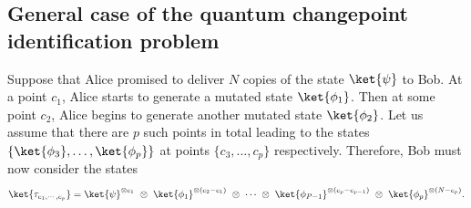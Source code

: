 \appendix

	
\begin{appendices}

\chapter{General case of the quantum changepoint identification problem} \label{app:mQCP}

Suppose that Alice promised to deliver $N$ copies of the state $\ket{\psi}$ to Bob.
At a point $c_1$, Alice starts to generate a mutated state $\ket{\phi_1}$.
Then at some point $c_2$, Alice begins to generate another mutated state $\ket{\phi_2}$.
Let us assume that there are $p$ such points in total leading to the states $\{\ket{\phi_3}, \dots, \ket{\phi_p}\}$ at points $\{c_3, \dots, c_p\}$ respectively.
Therefore, Bob must now consider the states
\begin{align}
    \label{eq:ch3_QSD-CP_P}
    \ket{\tau_{c_1, \cdots, c_p}} = \ket{\psi}^{\otimes c_1}\ \otimes\ \ket{\phi_1}^{\otimes (c_2 - c_1)}\ \otimes\ \cdots\ \otimes\ \ket{\phi_{P-1}}^{\otimes (c_p - c_{p-1})}\ \otimes\ \ket{\phi_p}^{\otimes (N - c_p)}.
\end{align}


\end{appendices}
